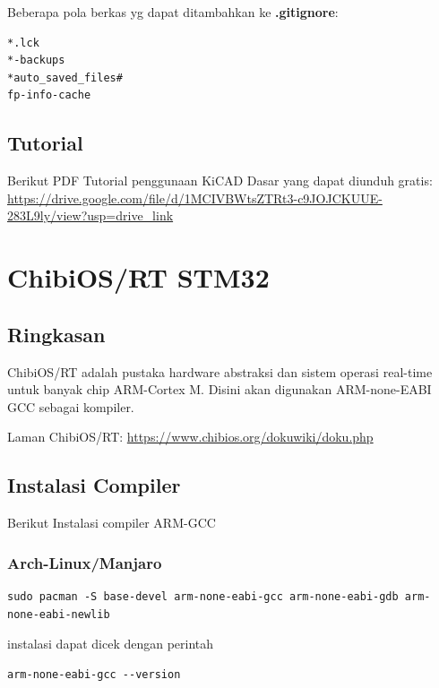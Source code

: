 \documentclass[12pt]{book}
\begin{document}
	Beberapa pola berkas yg dapat ditambahkan ke \textbf{.gitignore}:
	
	\begin{verbatim}
*.lck
*-backups
*auto_saved_files#
fp-info-cache
	\end{verbatim}
	
	\section{Tutorial}
	
	Berikut PDF Tutorial penggunaan KiCAD Dasar yang dapat diunduh gratis: \\
	\url{https://drive.google.com/file/d/1MCIVBWtsZTRt3-c9JOJCKUUE-283L9ly/view?usp=drive_link}
	
	
	\newpage
	\chapter{ChibiOS/RT STM32}
	
	\section{Ringkasan}
	
	ChibiOS/RT adalah pustaka hardware abstraksi dan sistem operasi real-time untuk banyak chip ARM-Cortex M.
	Disini akan digunakan ARM-none-EABI GCC sebagai kompiler.
	
	Laman ChibiOS/RT: \url{https://www.chibios.org/dokuwiki/doku.php}
	
	\section{Instalasi Compiler}
	
	Berikut Instalasi compiler ARM-GCC
	
	\subsection{Arch-Linux/Manjaro}

	\begin{verbatim}
sudo pacman -S base-devel arm-none-eabi-gcc arm-none-eabi-gdb arm-none-eabi-newlib
	\end{verbatim}
	
	instalasi dapat dicek dengan perintah
	\begin{verbatim}
arm-none-eabi-gcc --version
	\end{verbatim}
	
\end{document}
